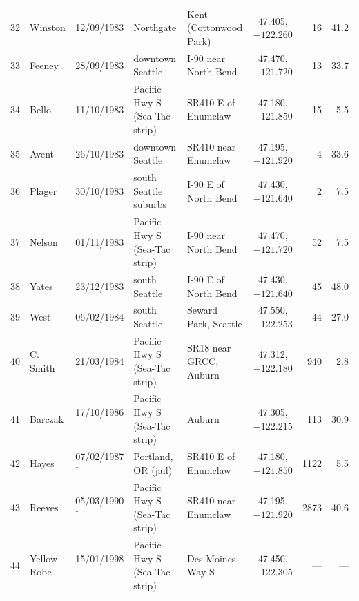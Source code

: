 \documentclass[11pt,a4paper]{article}
\begin{document}
{\begin{longtable}{rllp{3.1cm}p{3.1cm}crr}
32 & Winston & 12/09/1983 & Northgate & Kent (Cottonwood Park) & 47.405, $-122.260$ & 16 & 41.2\\
33 & Feeney & 28/09/1983 & downtown Seattle & I-90 near North Bend & 47.470, $-121.720$ & 13 & 33.7\\
34 & Bello & 11/10/1983 & Pacific Hwy S (Sea-Tac strip) & SR410 E of Enumclaw & 47.180, $-121.850$ & 15 & 5.5\\
35 & Avent & 26/10/1983 & downtown Seattle & SR410 near Enumclaw & 47.195, $-121.920$ & 4 & 33.6\\
36 & Plager & 30/10/1983 & south Seattle suburbs & I-90 E of North Bend & 47.430, $-121.640$ & 2 & 7.5\\
37 & Nelson & 01/11/1983 & Pacific Hwy S (Sea-Tac strip) & I-90 near North Bend & 47.470, $-121.720$ & 52 & 7.5\\
38 & Yates & 23/12/1983 & south Seattle & I-90 E of North Bend & 47.430, $-121.640$ & 45 & 48.0\\
39 & West & 06/02/1984 & south Seattle & Seward Park, Seattle & 47.550, $-122.253$ & 44 & 27.0\\
40 & C. Smith & 21/03/1984 & Pacific Hwy S (Sea-Tac strip) & SR18 near GRCC, Auburn & 47.312, $-122.180$ & 940 & 2.8\\
41 & Barczak & 17/10/1986$^\dagger$ & Pacific Hwy S (Sea-Tac strip) & Auburn & 47.305, $-122.215$ & 113 & 30.9\\
42 & Hayes & 07/02/1987$^\dagger$ & Portland, OR (jail) & SR410 E of Enumclaw & 47.180, $-121.850$ & 1122 & 5.5\\
43 & Reeves & 05/03/1990$^\dagger$ & Pacific Hwy S (Sea-Tac strip) & SR410 near Enumclaw & 47.195, $-121.920$ & 2873 & 40.6\\
44 & Yellow Robe & 15/01/1998$^\dagger$ & Pacific Hwy S (Sea-Tac strip) & Des Moines Way S & 47.450, $-122.305$ & --- & ---\\
\bottomrule
\end{longtable}}
\end{document}
